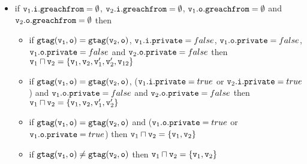 \begin{itemize}
 \item if $\mathtt{v}_1.\mathtt{i}.\mathtt{greachfrom} = \emptyset$, $\mathtt{v}_2.\mathtt{i}.\mathtt{greachfrom} = \emptyset$, $\mathtt{v}_1.\mathtt{o}.\mathtt{greachfrom} = \emptyset$ and $\mathtt{v}_2.\mathtt{o}.\mathtt{greachfrom} = \emptyset$ then 
 \begin{itemize}
 \item if $\tt gtag(\mathtt{v}_1, o) = gtag(\mathtt{v}_2, o)$, $\mathtt{v}_1.\mathtt{i}.\mathtt{private} = false$, $\mathtt{v}_1.\mathtt{o}.\mathtt{private} = false$, $\mathtt{v}_1.\mathtt{o}.\mathtt{private} = false$ and $\mathtt{v}_2.\mathtt{o}.\mathtt{private} = false$ then  $\mathtt{v}_1 \sqcap \mathtt{v}_2 = \{\mathtt{v}_1,\mathtt{v}_2,\mathtt{v}_1',\mathtt{v}_2',\mathtt{v}_{12}\}$ %
    
    
   \item if $\tt gtag(\mathtt{v}_1, o) = gtag(\mathtt{v}_2, o)$, ($\mathtt{v}_1.\mathtt{i}.\mathtt{private} = true$ or $\mathtt{v}_2.\mathtt{i}.\mathtt{private} = true$) and $\mathtt{v}_1.\mathtt{o}.\mathtt{private} = false$ and $\mathtt{v}_2.\mathtt{o}.\mathtt{private} = false$ then  $\mathtt{v}_1 \sqcap \mathtt{v}_2 = \{\mathtt{v}_1,\mathtt{v}_2,\mathtt{v}_1',\mathtt{v}_2'\}$  

  \item if $\tt gtag(\mathtt{v}_1, o) = gtag(\mathtt{v}_2, o)$ and ($\mathtt{v}_1.\mathtt{o}.\mathtt{private} = true$ or $\mathtt{v}_1.\mathtt{o}.\mathtt{private} = true$) then  $\mathtt{v}_1 \sqcap \mathtt{v}_2 = \{\mathtt{v}_1,\mathtt{v}_2\}$ 

    \item if $\tt gtag(\mathtt{v}_1, o) \neq gtag(\mathtt{v}_2, o)$ then $\mathtt{v}_1 \sqcap \mathtt{v}_2 = \{\mathtt{v}_1,\mathtt{v}_2\}$
 \end{itemize}
 
 \end{itemize}


